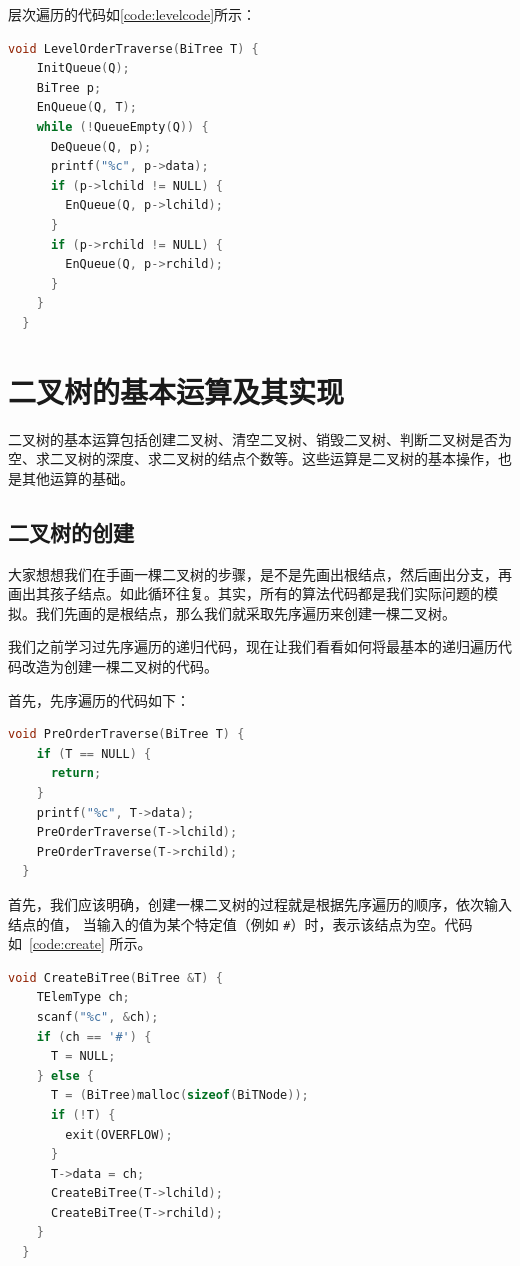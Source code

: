 \documentclass[lang=cn,newtx,10pt,scheme=chinese]{../elegantbook}
\begin{document}
层次遍历的代码如\ref{code:levelcode}所示：

\begin{lstlisting}[language=C++, caption={层次遍历}, label={code:levelcode}]
  void LevelOrderTraverse(BiTree T) {
    InitQueue(Q);
    BiTree p;
    EnQueue(Q, T);
    while (!QueueEmpty(Q)) {
      DeQueue(Q, p);
      printf("%c", p->data);
      if (p->lchild != NULL) {
        EnQueue(Q, p->lchild);
      }
      if (p->rchild != NULL) {
        EnQueue(Q, p->rchild);
      }
    }
  }
\end{lstlisting}



\section{二叉树的基本运算及其实现}
二叉树的基本运算包括创建二叉树、清空二叉树、销毁二叉树、判断二叉树是否为空、求二叉树的深度、求二叉树的结点个数等。这些运算是二叉树的基本操作，也是其他运算的基础。
\subsection{二叉树的创建}

大家想想我们在手画一棵二叉树的步骤，是不是先画出根结点，然后画出分支，再画出其孩子结点。如此循环往复。其实，所有的算法代码都是我们实际问题的模拟。我们先画的是根结点，那么我们就采取先序遍历来创建一棵二叉树。

我们之前学习过先序遍历的递归代码，现在让我们看看如何将最基本的递归遍历代码改造为创建一棵二叉树的代码。

首先，先序遍历的代码如下：

\begin{lstlisting}[language=C++, caption={先序遍历}]
  void PreOrderTraverse(BiTree T) {
    if (T == NULL) {
      return;
    }
    printf("%c", T->data);
    PreOrderTraverse(T->lchild);
    PreOrderTraverse(T->rchild);
  }
\end{lstlisting}

首先，我们应该明确，创建一棵二叉树的过程就是根据先序遍历的顺序，依次输入结点的值，
当输入的值为某个特定值（例如 \texttt{\#}）时，表示该结点为空。代码如~\ref{code:create} 所示。

\begin{lstlisting}[language=C++, caption={创建二叉树}, label={code:create}]
  void CreateBiTree(BiTree &T) {
    TElemType ch;
    scanf("%c", &ch);
    if (ch == '#') {
      T = NULL;
    } else {
      T = (BiTree)malloc(sizeof(BiTNode));
      if (!T) {
        exit(OVERFLOW);
      }
      T->data = ch;
      CreateBiTree(T->lchild);
      CreateBiTree(T->rchild);
    }
  }
\end{lstlisting}
\end{document}
